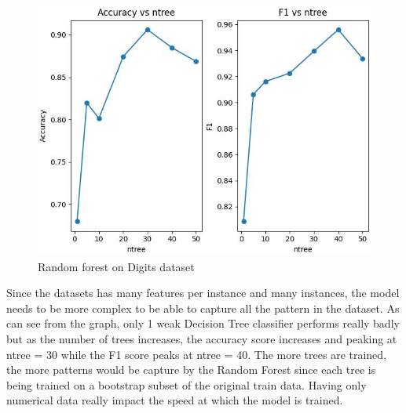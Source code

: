 \documentclass[letterpaper]{article}
\begin{document}
\begin{figure}[H]
	\includegraphics[width=\textwidth]{figures/forest_digits_ig.jpg}
	\caption{Random forest on Digits dataset}
	\label{fig:forest-digits}
\end{figure}

Since the datasets has many features per instance and many instances, the model needs to be more complex to be able to capture all the pattern
in the dataset. As can see from the graph, only 1 weak Decision Tree classifier performs really badly but as the number of trees increases, the accuracy
score increases and peaking at ntree = 30 while the F1 score peaks at ntree = 40. The more trees are trained, the more patterns would be capture by
the Random Forest since each tree is being trained on a bootstrap subset of the original train data. Having only numerical data really impact the
speed at which the model is trained.
\end{document}
